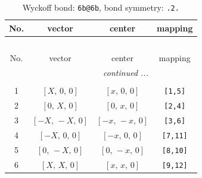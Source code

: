 \documentclass[fleqn,8pt]{jsarticle}
\begin{document}
\begin{longtable}{cccc}
\caption{Wyckoff bond: {\tt 6b@6b}, bond symmetry: {\tt .2.}}
 \\
 \hline \hline
No. & vector & center & mapping \\ \hline \endfirsthead

\multicolumn{3}{l}{\tablename\ \thetable{}} \\
 \hline \hline
No. & vector & center & mapping \\ \hline \endhead

 \hline \hline
\multicolumn{3}{r}{\footnotesize\it continued ...} \\ \endfoot

 \hline \hline
\multicolumn{3}{r}{} \\ \endlastfoot

1 & $\left[ X,\, 0,\, 0 \right]$ & $\left[ x,\, 0,\, 0 \right]$ & {\tt [1,5]} \\ \hline
2 & $\left[ 0,\, X,\, 0 \right]$ & $\left[ 0,\, x,\, 0 \right]$ & {\tt [2,4]} \\ \hline
3 & $\left[ - X,\, - X,\, 0 \right]$ & $\left[ - x,\, - x,\, 0 \right]$ & {\tt [3,6]} \\ \hline
4 & $\left[ - X,\, 0,\, 0 \right]$ & $\left[ - x,\, 0,\, 0 \right]$ & {\tt [7,11]} \\ \hline
5 & $\left[ 0,\, - X,\, 0 \right]$ & $\left[ 0,\, - x,\, 0 \right]$ & {\tt [8,10]} \\ \hline
6 & $\left[ X,\, X,\, 0 \right]$ & $\left[ x,\, x,\, 0 \right]$ & {\tt [9,12]} \\
\end{longtable}
\renewcommand{\arraystretch}{1.2}
\end{document}
